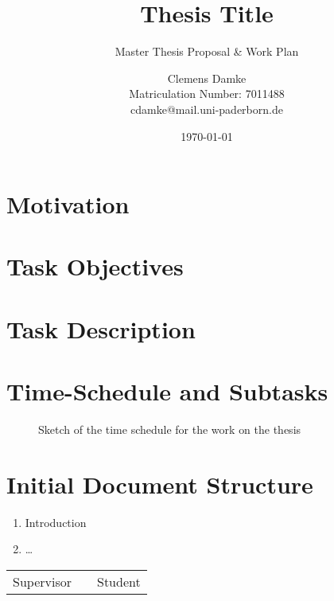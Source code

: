 \documentclass[12pt]{scrartcl}
\begin{document}
\title{Thesis Title}
\subtitle{Master Thesis Proposal \& Work Plan}
\author{Clemens Damke\\ \small{Matriculation Number: 7011488}\\ \small{cdamke@mail.uni-paderborn.de}}
\date{\today}
\maketitle

\section{Motivation}\label{sec:motivation}



\section{Task Objectives}\label{sec:task-objectives}

\section{Task Description}\label{sec:task-description}

\section{Time-Schedule and Subtasks}\label{sec:schedule-and-subtasks}

\begin{figure}[!ht]
	\centering
	\caption{Sketch of the time schedule for the work on the thesis}\label{fig:time-schedule}
\end{figure}
\section{Initial Document Structure}\label{sec:doc-structure}
\begin{enumerate}
	\item Introduction
	\item \dots
\end{enumerate}
\newpage



\vspace{6cm}

\begin{center}
	\begin{tabular}{l p{} r}
		\cline{1-1} \cline{3-3}
		\begin{minipage}[t]{0.4\textwidth}
			\centering
			\vspace{0cm}Supervisor
		\end{minipage}
		&
		\begin{minipage}[t]{0.2\textwidth}
		\end{minipage}
		&
		\begin{minipage}[t]{0.4\textwidth}
			\centering
			\vspace{0cm}Student
		\end{minipage}
	\end{tabular}
\end{center}
\end{document}
